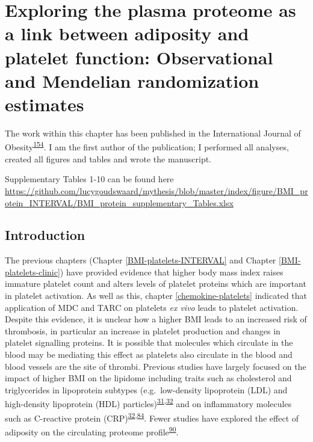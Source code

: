 \documentclass[11pt,twoside]{bristolthesis}
\begin{document}
\hypertarget{BMI-protein-MR}{%
\chapter{Exploring the plasma proteome as a link between adiposity and platelet function: Observational and Mendelian randomization estimates}\label{BMI-protein-MR}}

The work within this chapter has been published in the International Journal of Obesity\textsuperscript{\protect\hyperlink{ref-Goudswaard2021}{154}}. I am the first author of the publication; I performed all analyses, created all figures and tables and wrote the manuscript.

Supplementary Tables 1-10 can be found here \url{https://github.com/lucygoudswaard/mythesis/blob/master/index/figure/BMI_protein_INTERVAL/BMI_protein_supplementary_Tables.xlsx}

\hypertarget{introduction}{%
\section{Introduction}\label{introduction}}

The previous chapters (Chapter \ref{BMI-platelets-INTERVAL} and Chapter \ref{BMI-platelets-clinic}) have provided evidence that higher body mass index raises immature platelet count and alters levels of platelet proteins which are important in platelet activation. As well as this, chapter \ref{chemokine-platelets} indicated that application of MDC and TARC on platelets \emph{ex vivo} leads to platelet activation. Despite this evidence, it is unclear how a higher BMI leads to an increased risk of thrombosis, in particular an increase in platelet production and changes in platelet signalling proteins. It is possible that molecules which circulate in the blood may be mediating this effect as platelets also circulate in the blood and blood vessels are the site of thrombi. Previous studies have largely focused on the impact of higher BMI on the lipidome including traits such as cholesterol and triglycerides in lipoprotein subtypes (e.g.~low-density lipoprotein (LDL) and high-density lipoprotein (HDL) particles)\textsuperscript{\protect\hyperlink{ref-Bell2018a}{31},\protect\hyperlink{ref-Wurtz2014}{32}} and on inflammatory molecules such as C-reactive protein (CRP)\textsuperscript{\protect\hyperlink{ref-Wurtz2014}{32},\protect\hyperlink{ref-Timpson2011}{84}}. Fewer studies have explored the effect of adiposity on the circulating proteome profile\textsuperscript{\protect\hyperlink{ref-Cominetti2018}{90}}.
\end{document}
